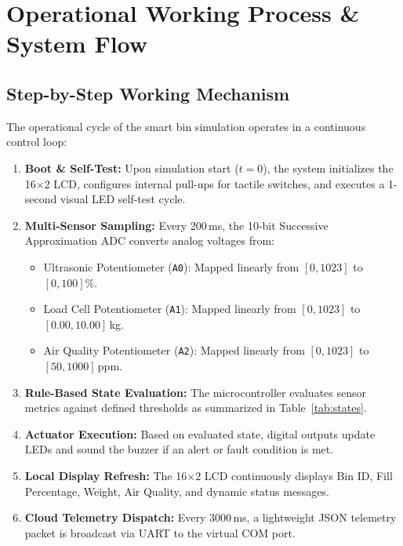\documentclass[12pt,a4paper]{article}
\begin{document}
\section{Operational Working Process \& System Flow}

\subsection{Step-by-Step Working Mechanism}
The operational cycle of the smart bin simulation operates in a continuous control loop:
\begin{enumerate}[leftmargin=*]
    \item \textbf{Boot \& Self-Test:} Upon simulation start ($t=0$), the system initializes the 16$\times$2 LCD, configures internal pull-ups for tactile switches, and executes a 1-second visual LED self-test cycle.
    \item \textbf{Multi-Sensor Sampling:} Every 200\,ms, the 10-bit Successive Approximation ADC converts analog voltages from:
    \begin{itemize}
        \item Ultrasonic Potentiometer (\texttt{A0}): Mapped linearly from $[0, 1023]$ to $[0, 100]\%$.
        \item Load Cell Potentiometer (\texttt{A1}): Mapped linearly from $[0, 1023]$ to $[0.00, 10.00]$\,kg.
        \item Air Quality Potentiometer (\texttt{A2}): Mapped linearly from $[0, 1023]$ to $[50, 1000]$\,ppm.
    \end{itemize}
    \item \textbf{Rule-Based State Evaluation:} The microcontroller evaluates sensor metrics against defined thresholds as summarized in Table~\ref{tab:states}.
    \item \textbf{Actuator Execution:} Based on evaluated state, digital outputs update LEDs and sound the buzzer if an alert or fault condition is met.
    \item \textbf{Local Display Refresh:} The 16$\times$2 LCD continuously displays Bin ID, Fill Percentage, Weight, Air Quality, and dynamic status messages.
    \item \textbf{Cloud Telemetry Dispatch:} Every 3000\,ms, a lightweight JSON telemetry packet is broadcast via UART to the virtual COM port.
\end{enumerate}
\end{document}
